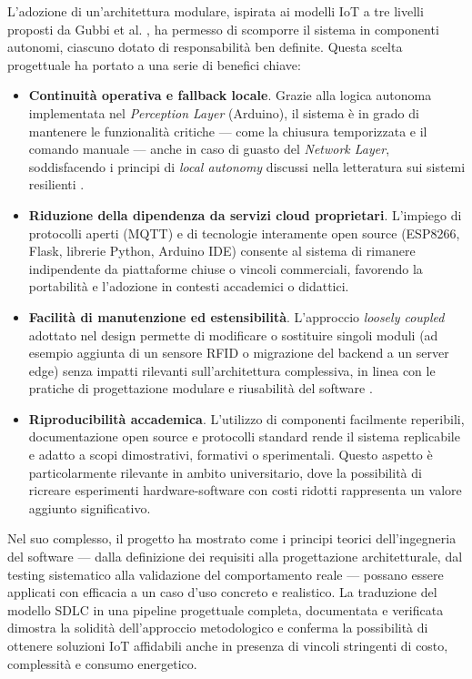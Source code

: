 L'adozione di un'architettura modulare, ispirata ai modelli IoT a tre livelli proposti da Gubbi et al. \cite{Gubbi2013}, ha permesso di scomporre il sistema in componenti autonomi, ciascuno dotato di responsabilità ben definite. Questa scelta progettuale ha portato a una serie di benefici chiave:

\begin{itemize}
    \item \textbf{Continuità operativa e fallback locale}. Grazie alla logica autonoma implementata nel \textit{Perception Layer} (Arduino), il sistema è in grado di mantenere le funzionalità critiche — come la chiusura temporizzata e il comando manuale — anche in caso di guasto del \textit{Network Layer}, soddisfacendo i principi di \textit{local autonomy} discussi nella letteratura sui sistemi resilienti \cite{Tang2022, Avizienis2004}.
    
    \item \textbf{Riduzione della dipendenza da servizi cloud proprietari}. L'impiego di protocolli aperti (MQTT) e di tecnologie interamente open source (ESP8266, Flask, librerie Python, Arduino IDE) consente al sistema di rimanere indipendente da piattaforme chiuse o vincoli commerciali, favorendo la portabilità e l'adozione in contesti accademici o didattici.
    
    \item \textbf{Facilità di manutenzione ed estensibilità}. L'approccio \textit{loosely coupled} adottato nel design permette di modificare o sostituire singoli moduli (ad esempio aggiunta di un sensore RFID o migrazione del backend a un server edge) senza impatti rilevanti sull'architettura complessiva, in linea con le pratiche di progettazione modulare e riusabilità del software \cite{Pressman2019}.
    
    \item \textbf{Riproducibilità accademica}. L'utilizzo di componenti facilmente reperibili, documentazione open source e protocolli standard rende il sistema replicabile e adatto a scopi dimostrativi, formativi o sperimentali. Questo aspetto è particolarmente rilevante in ambito universitario, dove la possibilità di ricreare esperimenti hardware-software con costi ridotti rappresenta un valore aggiunto significativo.
\end{itemize}

Nel suo complesso, il progetto ha mostrato come i principi teorici dell'ingegneria del software — dalla definizione dei requisiti alla progettazione architetturale, dal testing sistematico alla validazione del comportamento reale — possano essere applicati con efficacia a un caso d'uso concreto e realistico. La traduzione del modello SDLC in una pipeline progettuale completa, documentata e verificata dimostra la solidità dell'approccio metodologico e conferma la possibilità di ottenere soluzioni IoT affidabili anche in presenza di vincoli stringenti di costo, complessità e consumo energetico.

